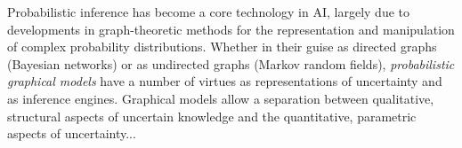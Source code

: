 
Probabilistic inference has become a core technology in AI,
largely due to developments in graph-theoretic methods for the 
representation and manipulation of complex probability 
distributions.  Whether in their guise as 
directed graphs (Bayesian networks) or as undirected graphs (Markov 
random fields), \emph{probabilistic graphical models} have a number 
of virtues as representations of uncertainty and as inference engines.  
Graphical models allow a separation between qualitative, structural
aspects of uncertain knowledge and the quantitative, parametric aspects 
of uncertainty...


